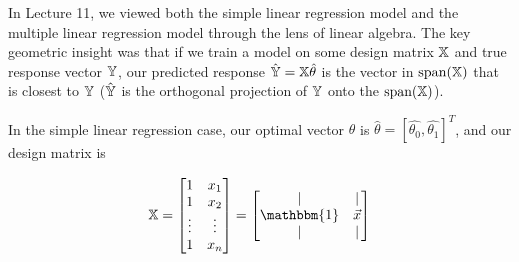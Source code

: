 \documentclass[addpoints, 12pt]{exam}
\theoremstyle{definition}
\newtheorem*{answer}{Answer}
\begin{document}
\begin{questions}


\newpage



\question[7] In Lecture 11, we viewed both the simple linear regression model and the multiple linear regression model through the lens of linear algebra. The key geometric insight was that if we train a model on some design matrix $\Bbb{X}$ and true response vector $\Bbb{Y}$, our predicted response $\hat{\Bbb{Y}} = \Bbb{X} \hat{\theta}$ is the vector in $\text{span}(\Bbb{X})$ that is closest to $\Bbb{Y}$ ($\hat{\Bbb{Y}}$ is the orthogonal projection of $\Bbb{Y}$ onto the $\text{span}(\Bbb{X})$). 

In the simple linear regression case, our optimal vector $\theta$ is $\hat{\theta} = [\hat{\theta_0}, \hat{\theta_1}]^T$, and our design matrix is

$$\Bbb{X} = \begin{bmatrix} 1 & x_1 \\ 1 & x_2 \\ \vdots & \vdots \\ 1 & x_n \end{bmatrix} = \begin{bmatrix} | & | \\ \mathbbm{1} & \vec{x} \\ | & | \end{bmatrix}$$


\end{questions}
\end{document}
